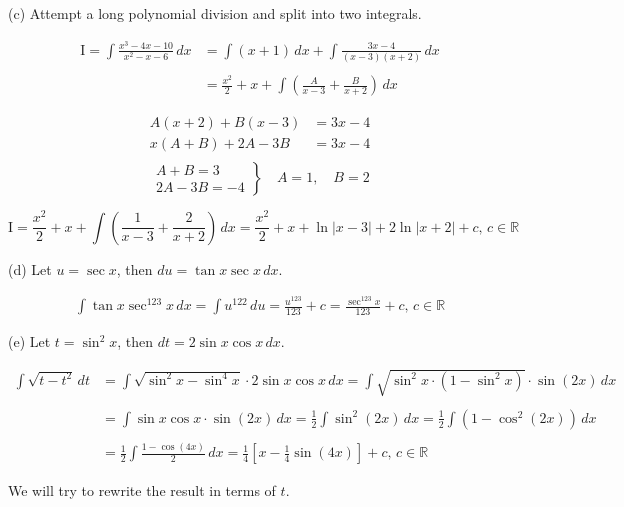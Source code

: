 \documentclass{article}
\begin{document}
\hfill

\noindent (c) Attempt a long polynomial division and split into two integrals.

\begin{align*}
\mathrm{I}=\int\frac{x^3-4x-10}{x^2-x-6}\,dx&=\int(x+1)\,dx+\int\frac{3x-4}{(x-3)(x+2)}\,dx\\\\&=\frac{x^2}2+x+\int\left({\frac{A}{x-3}+\frac{B}{x+2}}\right)\,dx
\end{align*}

\begin{align*}
A(x+2)+B(x-3)&=3x-4\\
x(A+B)+2A-3B&=3x-4\\
\end{align*}
\[
\left.
\begin{array}{ll}
A+B=3\\
2A-3B=-4
\end{array}
\right\}
\quad A=1,\quad B=2
\]

\begin{equation*}
\mathrm{I}=\frac{x^2}2+x+\int\left({\frac{1}{x-3}+\frac{2}{x+2}}\right)\,dx=\boxed{\frac{x^2}2+x+\ln|x-3|+2\ln|x+2|+c,\,c\in\mathbb{R}}
\end{equation*}

\hfill

\noindent (d) Let $u=\sec x$, then $du=\tan x \sec x \,dx$.

\begin{align*}\int\tan x\sec^{123}x\,dx=\int u^{122}\,du=\frac{u^{123}}{123}+c = \boxed{\frac{\sec^{123}x}{123}+c,\,c\in\mathbb{R}}\end{align*}

\hfill

\noindent (e) Let $t=\sin^2x$, then $dt=2\sin x\cos x\,dx$.

\begin{align*}\int\sqrt{t-t^2}\,dt&=\int\sqrt{\sin^2x-\sin^4x}\cdot2\sin x \cos x \,dx=\int\sqrt{\sin^2x\cdot(1-\sin^2x)}\cdot\sin(2x)\,dx\\\\&=\int\sin x \cos x\cdot\sin(2x)\,dx=\frac12\int\sin^2(2x)\,dx=\frac12\int\left(1-\cos^2(2x)\right)\,dx\\\\&=\frac12\int\frac{1-\cos(4x)}2\,dx=\frac14\left[x-\frac14\sin(4x)\right]+c,\,c\in\mathbb{R}\end{align*}

\hfill

\noindent We will try to rewrite the result in terms of $t$.
\end{document}
